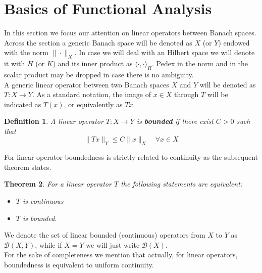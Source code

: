 \documentclass[corpo=11pt, stile=classica, tipotesi=custom,
greek, evenboxes, english]{toptesi}
\numberwithin{equation}{chapter}
\newtheorem{teo}{Theorem}[chapter] %
\newtheorem{defi}[teo]{Definition}
\theoremstyle{remark}
\newcommand{\B}{\mathscr{B}} %
\begin{document}
\section{Basics of Functional Analysis}\label{section basics of functional analysis}
In this section we focus our attention on linear operators between Banach spaces. Across the section a generic Banach space will be denoted as $X$ (or $Y$) endowed with the norm $\| \cdot \|_X$. In case we will deal with an Hilbert space we will denote it with $H$ (or $K$) and its inner product as $\langle \cdot, \cdot \rangle_H$. {\color{red}Pedex in the norm and in the scalar product may be dropped in case there is no ambiguity}.\\
A generic linear operator between two Banach spaces $X$ and $Y$ will be denoted as $T : X \rightarrow Y$. As a standard notation, the image of $x \in X$ through $T$ will be indicated as $T(x)$, or equivalently as $Tx$.
\begin{defi}\label{bounded operator}
	A linear operator $T : X \rightarrow Y$ is \textbf{bounded} if there exist $C>0$ such that
	\begin{equation}\label{boundedness property}
		\| Tx \|_Y \leq C \| x \|_X \quad \forall x \in X
	\end{equation}
\end{defi}
For linear operator boundedness is strictly related to continuity as the subsequent theorem states.
\begin{teo}\label{equivalente boundedness continuity}
	For a linear operator $T$ the following statements are equivalent:
	\begin{itemize}
		\item $T$ is continuous
		\item $T$ is bounded.
	\end{itemize}
\end{teo}
We denote the set of linear bounded (continuous) operators from $X$ to $Y$ as $\B(X,Y)$, while if $X=Y$ we will just write $\B(X)$.\\
For the sake of completeness we mention that actually, for linear operators, boundedness is equivalent to uniform continuity.
\end{document}
